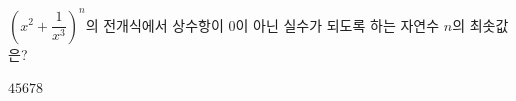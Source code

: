 $\left(x^2+\dfrac{1}{x^3}\right)^n$의 전개식에서 상수항이 $0$이 아닌 실수가 되도록 하는 자연수 $n$의 최솟값은?
\begin{choices32}{$4$}{$5$}{$6$}{$7$}{$8$}\end{choices32}
